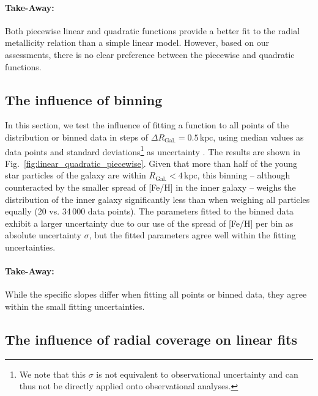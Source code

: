 \documentclass[twocolumn,apj,numberedappendix,appendixfloats]{openjournal}
\begin{document}
\begin{CJK*}{UTF8}{gbsn}
\paragraph*{Take-Away:} Both piecewise linear and quadratic functions provide a better fit to the radial metallicity relation than a simple linear model. However, based on our assessments, there is no clear preference between the piecewise and quadratic functions.

\subsection{The influence of binning}
\label{sec:binning}

In this section, we test the influence of fitting a function to all points of the distribution or binned data in steps of $\Delta R_\mathrm{Gal.} = 0.5\,\mathrm{kpc}$, using median values as data points and standard deviations\footnote{We note that this $\sigma$ is not equivalent to observational uncertainty and can thus not be directly applied onto observational analyses.} as uncertainty \citep[see also][who fitted functions to radially binned IllustrisTNG data]{Hemler2021}. The results are shown in Fig.~\ref{fig:linear_quadratic_piecewise}. Given that more than half of the young star particles of the galaxy are within $R_\mathrm{Gal.} < 4\,\mathrm{kpc}$, this binning -- although counteracted by the smaller spread of [Fe/H] in the inner galaxy -- weighs the distribution of the inner galaxy significantly less than when weighing all particles equally (20 vs. 34\,000 data points). The parameters fitted to the binned data exhibit a larger uncertainty due to our use of the spread of [Fe/H] per bin as absolute uncertainty $\sigma$, but the fitted parameters agree well within the fitting uncertainties.

\paragraph*{Take-Away:} While the specific slopes differ when fitting all points or binned data, they agree within the small fitting uncertainties.

\subsection{The influence of radial coverage on linear fits}
\label{sec:radial_coverage}


\end{CJK*}
\end{document}
